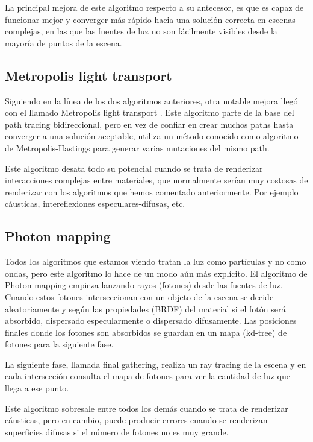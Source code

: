 \medskip
La principal mejora de este algoritmo respecto a su antecesor, es que es capaz de funcionar mejor y converger más rápido hacia una solución correcta en escenas complejas, en las que las fuentes de luz no son fácilmente visibles desde la mayoría de puntos de la escena.

\subsection{Metropolis light transport}

Siguiendo en la línea de los dos algoritmos anteriores, otra notable mejora llegó con el llamado Metropolis light transport \cite{Veach1997}. Este algoritmo parte de la base del path tracing bidireccional, pero en vez de confiar en crear muchos paths hasta converger a una solución aceptable, utiliza un método conocido como algoritmo de Metropolis-Hastings para generar varias mutaciones del mismo path. 

\medskip
Este algoritmo desata todo su potencial cuando se trata de renderizar interacciones complejas entre materiales, que normalmente serían muy costosas de renderizar con los algoritmos que hemos comentado anteriormente. Por ejemplo cáusticas, intereflexiones especulares-difusas, etc.

\clearpage

\subsection{Photon mapping}

Todos los algoritmos que estamos viendo tratan la luz como partículas y no como ondas, pero este algoritmo lo hace de un modo aún más explícito.
El algoritmo de Photon mapping \cite{Jensen1996} empieza lanzando rayos (fotones) desde las fuentes de luz. Cuando estos fotones interseccionan con un objeto de la escena se decide aleatoriamente y según las propiedades (BRDF) del material si el fotón será absorbido, dispersado especularmente o dispersado difusamente. Las posiciones finales donde los fotones son absorbidos se guardan en un mapa (kd-tree) de fotones para la siguiente fase.

\medskip
La siguiente fase, llamada final gathering, realiza un ray tracing de la escena y en cada intersección consulta el mapa de fotones para ver la cantidad de luz que llega a ese punto.

\medskip
Este algoritmo sobresale entre todos los demás cuando se trata de renderizar cáusticas, pero en cambio, puede producir errores cuando se renderizan superficies difusas si el número de fotones no es muy grande.


